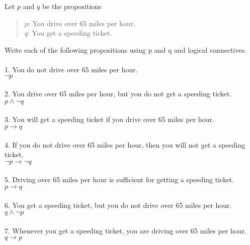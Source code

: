 \documentclass[12pt]{article}
\newenvironment{problem}[2][Problem]{\begin{trivlist}
\item[\hskip \labelsep {\bfseries #1}\hskip \labelsep {\bfseries #2.}]}{\end{trivlist}}
\begin{document}
\begin{problem}{2}
    Let $p$ and $q$ be the propositions 
    \begin{quote}
        $p$: You drive over 65 miles per hour.\\
        $q$: You get a speeding ticket.
    \end{quote}
    Write each of the following propositions using p and q and logical connectives.\\\\
    1. You do not drive over 65 miles per hour.\\
    $\neg p$\\\\
    2. You drive over 65 miles per hour, but you do not get a speeding ticket.\\
    $p \land \neg q$\\\\
    3. You will get a speeding ticket if you drive over 65 miles per hour.\\
    $p \rightarrow q$\\\\
    4. If you do not drive over 65 miles per hour, then you will not get a speeding ticket.\\
    $\neg p \rightarrow \neg q$\\\\
    5. Driving over 65 miles per hour is sufficient for getting a speeding ticket.\\
    $p \rightarrow q$\\\\
    6. You get a speeding ticket, but you do not drive over 65 miles per hour.\\
    $q \land \neg p$\\\\
    7. Whenever you get a speeding ticket, you are driving over 65 miles per hour.\\
    $q \rightarrow p$
\end{problem}
\pagebreak
\end{document}
